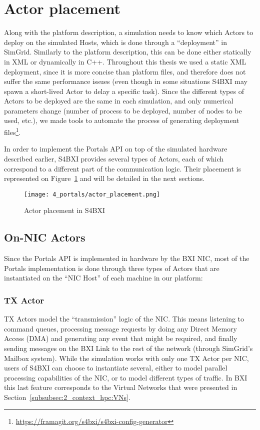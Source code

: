\section{Actor placement}

Along with the platform description, a simulation needs to know which Actors to
deploy on the simulated Hosts, which is done through a ``deployment'' in
SimGrid. Similarly to the platform description, this can be done either
statically in XML or dynamically in C++. Throughout this thesis we used a static
XML deployment, since it is more concise than platform files, and therefore does
not suffer the same performance issues (even though in some situations S4BXI may
spawn a short-lived Actor to delay a specific task). Since the different types
of Actors to be deployed are the same in each simulation, and only numerical
parameters change (number of process to be deployed, number of nodes to be used,
etc.), we made tools to automate the process of generating deployment
files\footnote{\url{https://framagit.org/s4bxi/s4bxi-config-generator}}.

In order to implement the Portals API on top of the simulated hardware described
earlier, S4BXI provides several types of Actors, each of which correspond to a
different part of the communication logic. Their placement is represented on
Figure~\ref{fig:4_portals:actor_placement} and will be detailed in the next
sections.

\begin{figure}[!ht]
    \centering
    \texttt{[image: 4\_portals/actor\_placement.png]}
    \caption{Actor placement in S4BXI}
    \label{fig:4_portals:actor_placement}
\end{figure}

\subsection{On-NIC Actors}

Since the Portals API is implemented in hardware by the BXI NIC, most of the
Portals implementation is done through three types of Actors that are
instantiated on the ``NIC Host'' of each machine in our platform:

\subsubsection{TX Actor}

TX Actors model the ``transmission'' logic of the NIC. This means listening to
command queues, processing message requests by doing any Direct Memory Access
(DMA) and generating any event that might be required, and finally sending
messages on the BXI Link to the rest of the network (through SimGrid's Mailbox
system). While the simulation works with only one TX Actor per NIC, users of
S4BXI can choose to instantiate several, either to model parallel processing
capabilities of the NIC, or to model different types of traffic. In BXI this
last feature corresponds to the Virtual Networks that were presented in
Section~\ref{subsubsec:2_context_hpc:VNs}.

